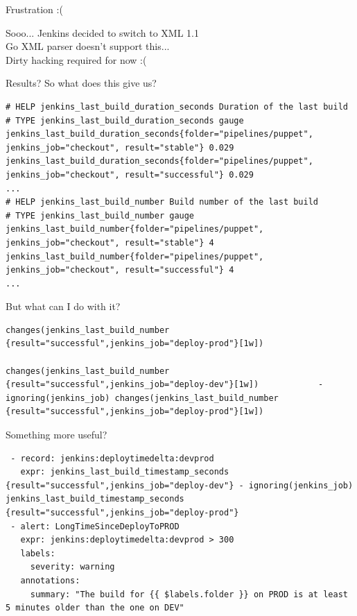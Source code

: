 \documentclass[aspectratio=169,12pt]{beamer}
\begin{document}
\begin{frame}{Frustration :(}
  \begin{center}
    Sooo... Jenkins decided to switch to XML 1.1 \\
    \vspace{20pt}
    Go XML parser doesn't support this... \\
    \vspace{20pt}
    Dirty hacking required for now :(
  \end{center}
\end{frame}

\begin{frame}[fragile]{Results?}
  So what does this give us?
  \begin{verbatim}
# HELP jenkins_last_build_duration_seconds Duration of the last build
# TYPE jenkins_last_build_duration_seconds gauge
jenkins_last_build_duration_seconds{folder="pipelines/puppet", jenkins_job="checkout", result="stable"} 0.029
jenkins_last_build_duration_seconds{folder="pipelines/puppet", jenkins_job="checkout", result="successful"} 0.029
...
# HELP jenkins_last_build_number Build number of the last build
# TYPE jenkins_last_build_number gauge
jenkins_last_build_number{folder="pipelines/puppet", jenkins_job="checkout", result="stable"} 4
jenkins_last_build_number{folder="pipelines/puppet", jenkins_job="checkout", result="successful"} 4
...
  \end{verbatim}
\end{frame}

\begin{frame}[fragile]{But what can I do with it?}
  \begin{verbatim}
changes(jenkins_last_build_number {result="successful",jenkins_job="deploy-prod"}[1w])

changes(jenkins_last_build_number {result="successful",jenkins_job="deploy-dev"}[1w])            - ignoring(jenkins_job) changes(jenkins_last_build_number {result="successful",jenkins_job="deploy-prod"}[1w])
  \end{verbatim}
\end{frame}

\begin{frame}[fragile]{Something more useful?}
  \begin{verbatim}
 - record: jenkins:deploytimedelta:devprod
   expr: jenkins_last_build_timestamp_seconds {result="successful",jenkins_job="deploy-dev"} - ignoring(jenkins_job) jenkins_last_build_timestamp_seconds {result="successful",jenkins_job="deploy-prod"}
 - alert: LongTimeSinceDeployToPROD
   expr: jenkins:deploytimedelta:devprod > 300
   labels:
     severity: warning
   annotations:
     summary: "The build for {{ $labels.folder }} on PROD is at least 5 minutes older than the one on DEV"
  \end{verbatim}
\end{frame}
\end{document}
